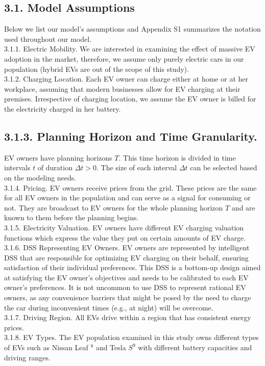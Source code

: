 \documentclass[10pt]{article}
\begin{document}
\subsection*{3.1. Model Assumptions}
Below we list our model's assumptions and Appendix S1 summarizes the notation used throughout our model.\\
3.1.1. Electric Mobility. We are interested in examining the effect of massive EV adoption in the market, therefore, we assume only purely electric cars in our population (hybrid EVs are out of the scope of this study).\\
3.1.2. Charging Location. Each EV owner can charge either at home or at her workplace, assuming that modern businesses allow for EV charging at their premises. Irrespective of charging location, we assume the EV owner is billed for the electricity charged in her battery.

\subsection*{3.1.3. Planning Horizon and Time Granularity.}
EV owners have planning horizons $T$. This time horizon is divided in time intervals $t$ of duration $\Delta t>0$. The size of each interval $\Delta t$ can be selected based on the modeling needs.\\
3.1.4. Pricing. EV owners receive prices from the grid. These prices are the same for all EV owners in the population and can serve as a signal for consuming or not. They are broadcast to EV owners for the whole planning horizon $T$ and are known to them before the planning begins.\\
3.1.5. Electricity Valuation. EV owners have different EV charging valuation functions which express the value they put on certain amounts of EV charge.\\
3.1.6. DSS Representing EV Owners. EV owners are represented by intelligent DSS that are responsible for optimizing EV charging on their behalf, ensuring satisfaction of their individual preferences. This DSS is a bottom-up design aimed at satisfying the EV owner's objectives and needs to be calibrated to each EV owner's preferences. It is not uncommon to use DSS to represent rational EV owners, as any convenience barriers that might be posed by the need to charge the car during inconvenient times (e.g., at night) will be overcome.\\
3.1.7. Driving Region. All EVs drive within a region that has consistent energy prices.\\
3.1.8. EV Types. The EV population examined in this study owns different types of EVs such as Nissan Leaf ${ }^{8}$ and Tesla $S^{9}$ with different battery capacities and driving ranges.
\end{document}
